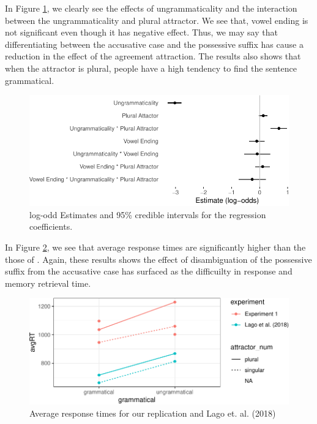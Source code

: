 \documentclass[doc]{apa6}
\begin{document}
In Figure \ref{fig:exp1ResponseModelPlot}, we clearly see the effects of ungrammaticality and the interaction between the ungrammaticality and plural attractor. We see that, vowel ending is not significant even though it has negative effect. Thus, we may say that differentiating between the accusative case and the possessive suffix has cause a reduction in the effect of the agreement attraction. The results also shows that when the attractor is plural, people have a high tendency to find the sentence grammatical.

\begin{figure}
\centering
\includegraphics{AgreementAttraction_files/figure-latex/exp1ResponseModelPlot-1.pdf}
\caption{\label{fig:exp1ResponseModelPlot}log-odd Estimates and 95\% credible intervals for the regression coefficients.}
\end{figure}

In Figure \ref{fig:exp1AvgRTs}, we see that average response times are significantly higher than the those of \textcite{Lago2018}. Again, these results shows the effect of disambiguation of the possessive suffix from the accusative case has surfaced as the difficuilty in response and memory retrieval time.

\begin{figure}
\centering
\includegraphics{AgreementAttraction_files/figure-latex/exp1AvgRTs-1.pdf}
\caption{\label{fig:exp1AvgRTs}Average response times for our replication and Lago et. al. (2018)}
\end{figure}
\end{document}
